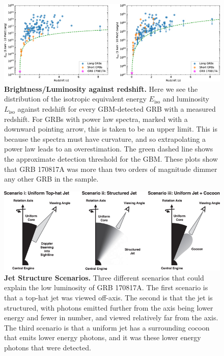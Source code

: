 \documentclass[11pt]{cuthesis}
\begin{document}
\begin{figure} %
\begin{center}
\includegraphics[width=1.0\linewidth]{grb_z_brightness.jpg}
\end{center}
\caption{\textbf{Brightness/Luminosity against redshift.} Here we see the distribution of the isotropic equivalent energy $E_\text{iso}$ and luminosity $L_\text{iso}$ against redshift for every GBM-detected GRB with a measured redshift. For GRBs with power law spectra, marked with a downward pointing arrow, this is taken to be an upper limit. This is because the spectra must have curvature, and so extrapolating a power law leads to an overestimation. The green dashed line shows the approximate detection threshold for the GBM. These plots show that GRB 170817A was more than two orders of magnitude dimmer any other GRB in the sample.\cite{GW170817_GRB}}
\label{fig:brightness_z}
\end{figure}

\begin{figure} %
\begin{center}
\includegraphics[width=1.0\linewidth]{jet_structure.jpg}
\end{center}
\caption{\textbf{Jet Structure Scenarios.} Three different scenarios that could explain the low luminosity of GRB 170817A. The first scenario is that a top-hat jet was viewed off-axis. The second is that the jet is structured, with photons emitted further from the axis being lower energy and fewer in number, and viewed relatively far from the axis. The third scenario is that a uniform jet has a surrounding cocoon that emits lower energy photons, and it was these lower energy photons that were detected.\cite{GW170817_GRB} }
\label{fig:jet}
\end{figure}
\end{document}
